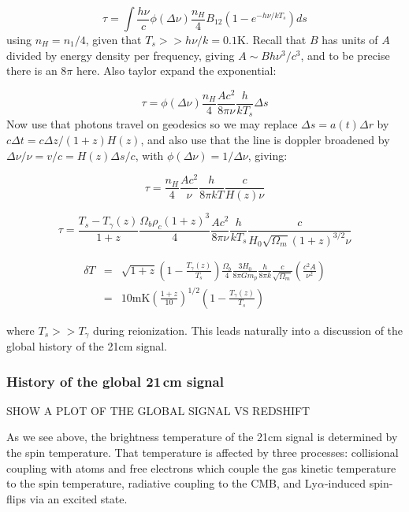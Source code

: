 \begin{equation}
\tau=\int\frac{h\nu}{c}\phi(\Delta\nu)\frac{n_H}{4}B_{12}(1-e^{-h\nu/kT_s})ds
\end{equation}
using $n_H=n_1/4$, given that $T_s>>h\nu/k=0.1$K. Recall that $B$ has units of $A$ divided by energy density per frequency, giving $A\sim Bh\nu^3/c^3$, and to be precise there is an $8\pi$ here. Also taylor expand the exponential:

\begin{equation}
\tau=\phi(\Delta\nu)\frac{n_H}{4}\frac{Ac^2}{8\pi\nu}\frac{h}{kT_s}\Delta s
\end{equation}
Now use that photons travel on geodesics so we may replace $\Delta s=a(t)\Delta r$ by $c\Delta t=c\Delta z/(1+z)H(z)$, and also use that the line is doppler broadened by $\Delta\nu/\nu=v/c=H(z)\Delta s/c$, with $\phi(\Delta\nu)=1/\Delta \nu$, giving:

\begin{equation}
\tau=\frac{n_H}{4}\frac{Ac^2}{\nu}\frac{h}{8\pi kT}\frac{c}{H(z)\nu}
\end{equation}

\begin{equation}
\tau=\frac{T_s-T_\gamma(z)}{1+z}\frac{\Omega_b\rho_c(1+z)^3}{4}\frac{Ac^2}{8\pi\nu}\frac{h}{kT_s}\frac{c}{H_0\sqrt{\Omega_m}(1+z)^{3/2}\nu}
\end{equation}

\begin{eqnarray}
\delta T&=&\sqrt{1+z}\left(1-\frac{T_\gamma(z)}{T_s}\right)\frac{\Omega_b}{4}\frac{3H_0}{8\pi Gm_p}\frac{h}{8\pi k}\frac{c}  {\sqrt{\Omega_m}}\left(\frac{c^2A}{\nu^2}\right)\\
&=&10\text{mK}\left(\frac{1+z}{10}\right)^{1/2}\left(1-\frac{T_\gamma(z)}{T_s}\right)
\end{eqnarray}

where $T_s>>T_\gamma$ during reionization. This leads naturally into a discussion of the global history of the 21cm signal.

\subsubsection{History of the global 21\,cm signal}

SHOW A PLOT OF THE GLOBAL SIGNAL VS REDSHIFT

As we see above, the brightness temperature of the 21cm signal is determined by the spin temperature. That temperature is affected by three processes: collisional coupling with atoms and free electrons which couple the gas kinetic temperature to the spin temperature, radiative coupling to the CMB, and Ly$\alpha$-induced spin-flips via an excited state. 

